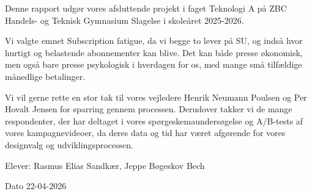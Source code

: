 Denne rapport udgør vores afsluttende projekt i faget Teknologi A på ZBC Handels- og Teknisk Gymnasium Slagelse i skoleåret 2025-2026. 

Vi valgte emnet Subscription fatigue, da vi begge to lever på SU, og indså hvor hurtigt og belastende abonnementer kan blive. Det kan både presse økonomisk, men også bare presse psykologisk i hverdagen for os, med mange små tilfældige månedlige betalinger.

Vi vil gerne rette en stor tak til vores vejledere Henrik Neumann Poulsen og Per Hovalt Jensen for sparring gennem processen. 
Derudover takker vi de mange respondenter, der har deltaget i vores spørgeskemaundersøgelse og A/B-tests af vores kampagnevideoer, da deres data og tid har været afgørende for vores designvalg og udviklingsprocessen.

Elever: Rasmus Elias Sandkær, Jeppe Bøgeskov Bech

Dato 22-04-2026